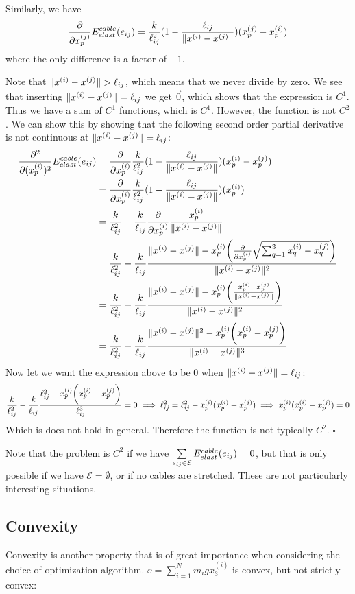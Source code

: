 Similarly, we have 
\begin{equation}
    \frac{\partial}{\partial x_p^{(j)}} E^{cable}_{elast}(e_{ij}) =  \frac{k}{\ell_{ij}^2} (1- \frac{\ell_{ij}}{\lVert x^{(i)} - x^{(j)}\rVert}) (x_p^{(j)} - x_p^{(i)})
\end{equation} where the only difference is a factor of $-1$.

Note that $\lVert x^{(i)} - x^{(j)}\rVert>\ell_{ij}$, which means that we never divide by zero. We see that inserting $\lVert x^{(i)} - x^{(j)}\rVert = \ell_{ij}$ we get $\vec{0}$, which shows that the expression is $C^1$. Thus we have a sum of $C^1$ functions, which is $C^1$. However, the function is not $C^2$. We can show this by showing that the following second order partial derivative is not continuous at $\lVert x^{(i)} - x^{(j)}\rVert = \ell_{ij}$:
\begin{align*}
    \frac{\partial^2}{\partial (x_p^{(i)})^2} E^{cable}_{elast}(e_{ij}) &= 
    \frac{\partial}{\partial x_p^{(i)}} \frac{k}{\ell_{ij}^2} (1- \frac{\ell_{ij}}{\lVert x^{(i)} - x^{(j)}\rVert}) (x_p^{(i)} - x_p^{(j)}) \\&
    = \frac{\partial}{\partial x_p^{(i)}} \frac{k}{\ell_{ij}^2} (1- \frac{\ell_{ij}}{\lVert x^{(i)} - x^{(j)}\rVert}) (x_p^{(i)}) \\&
    =\frac{k}{\ell_{ij}^2} - \frac{k}{\ell_{ij}} \frac{\partial}{\partial x_p^{(i)}} \frac{x_p^{(i)}}{\lVert x^{(i)} - x^{(j)}\rVert} \\&
    =\frac{k}{\ell_{ij}^2} -\frac{k}{\ell_{ij}} \frac{\lVert x^{(i)} - x^{(j)}\rVert - x_p^{(i)} \bigg( \frac{\partial}{\partial x_p^{(i)}} \sqrt{\sum_{q=1}^3 x_q^{(i)}-x_q^{(j)}} \bigg)}{\lVert x^{(i)} - x^{(j)}\rVert^2} \\&
    =\frac{k}{\ell_{ij}^2} -\frac{k}{\ell_{ij}} \frac{\lVert x^{(i)} - x^{(j)}\rVert - x_p^{(i)} \bigg( \frac{x_p^{(i)}-x_p^{(j)}}{\lVert x^{(i)} - x^{(j)}\rVert} \bigg)}{\lVert x^{(i)} - x^{(j)}\rVert^2} \\&
    =\frac{k}{\ell_{ij}^2} -\frac{k}{\ell_{ij}} \frac{\lVert x^{(i)} - x^{(j)}\rVert^2 - x_p^{(i)} \bigg( x_p^{(i)}-x_p^{(j)} \bigg)}{\lVert x^{(i)} - x^{(j)}\rVert^3}
\end{align*}
Now let we want the expression above to be $0$ when $\lVert x^{(i)} - x^{(j)}\rVert = \ell_{ij}$:
\begin{align*}
    \frac{k}{\ell_{ij}^2} -\frac{k}{\ell_{ij}} \frac{\ell_{ij}^2 - x_p^{(i)} \bigg( x_p^{(i)}-x_p^{(j)} \bigg)}{\ell_{ij}^3} = 0 \implies
     \ell_{ij}^2 = \ell_{ij}^2 - x_p^{(i)}(x_p^{(i)}-x_p^{(j)}) \implies
     x_p^{(i)}(x_p^{(i)}-x_p^{(j)})=0
\end{align*}
Which is does not hold in general. Therefore the function is not typically $C^2$. $\square$

Note that the problem is $C^2$ if we have
$\sum\limits_{e_{ij} \in \mathcal{E}} E^{cable}_{elast}(e_{ij}) = 0$, but that is only possible if we have $\mathcal{E} = \emptyset$, or if no cables are stretched. These are not particularly interesting situations.

\subsection{Convexity}
Convexity is another property that is of great importance when considering the choice of optimization algorithm.  $\ee =\sum_{i=1}^N m_i g x_3^{(i)}$ is convex, but not strictly convex:

